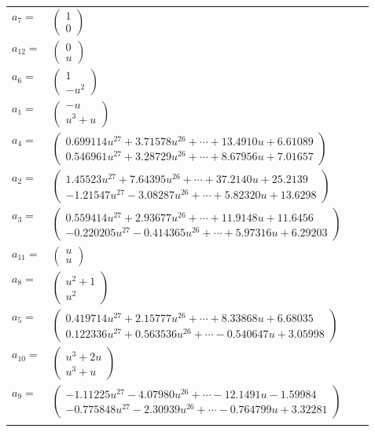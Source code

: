 \documentclass[1p]{elsarticle_modified}
\theoremstyle{definition}
\begin{document}
\begin{tabular}{m{7pt} m{180pt} m{7pt} m{180pt} }
\flushright $a_{7}=$&$\begin{pmatrix}1\\0\end{pmatrix}$ \\
\flushright $a_{12}=$&$\begin{pmatrix}0\\u\end{pmatrix}$ \\
\flushright $a_{6}=$&$\begin{pmatrix}1\\- u^2\end{pmatrix}$ \\
\flushright $a_{1}=$&$\begin{pmatrix}- u\\u^3+u\end{pmatrix}$ \\
\flushright $a_{4}=$&$\begin{pmatrix}0.699114 u^{27}+3.71578 u^{26}+\cdots+13.4910 u+6.61089\\0.546961 u^{27}+3.28729 u^{26}+\cdots+8.67956 u+7.01657\end{pmatrix}$ \\
\flushright $a_{2}=$&$\begin{pmatrix}1.45523 u^{27}+7.64395 u^{26}+\cdots+37.2140 u+25.2139\\-1.21547 u^{27}-3.08287 u^{26}+\cdots+5.82320 u+13.6298\end{pmatrix}$ \\
\flushright $a_{3}=$&$\begin{pmatrix}0.559414 u^{27}+2.93677 u^{26}+\cdots+11.9148 u+11.6456\\-0.220205 u^{27}-0.414365 u^{26}+\cdots+5.97316 u+6.29203\end{pmatrix}$ \\
\flushright $a_{11}=$&$\begin{pmatrix}u\\u\end{pmatrix}$ \\
\flushright $a_{8}=$&$\begin{pmatrix}u^2+1\\u^2\end{pmatrix}$ \\
\flushright $a_{5}=$&$\begin{pmatrix}0.419714 u^{27}+2.15777 u^{26}+\cdots+8.33868 u+6.68035\\0.122336 u^{27}+0.563536 u^{26}+\cdots-0.540647 u+3.05998\end{pmatrix}$ \\
\flushright $a_{10}=$&$\begin{pmatrix}u^3+2 u\\u^3+u\end{pmatrix}$ \\
\flushright $a_{9}=$&$\begin{pmatrix}-1.11225 u^{27}-4.07980 u^{26}+\cdots-12.1491 u-1.59984\\-0.775848 u^{27}-2.30939 u^{26}+\cdots-0.764799 u+3.32281\end{pmatrix}$\\&\end{tabular}
\end{document}
